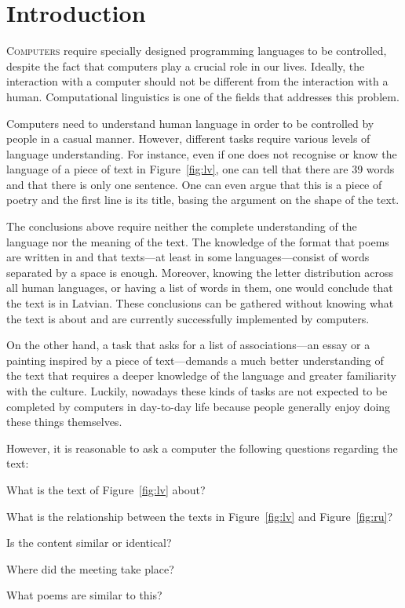 \chapter{Introduction}
\label{ch:introduction}

\lettrine[lines=5,loversize=0.25]{C}{omputers} require specially designed programming languages to be controlled, despite the fact that computers play a crucial role in our lives. Ideally, the interaction with a computer should not be different from the interaction with a human. Computational linguistics is one of the fields that addresses this problem.

Computers need to understand human language in order to be controlled by people in a casual manner. However, different tasks require various levels of language understanding. For instance, even if one does not recognise or know the language of a piece of text in Figure~\ref{fig:lv}, one can tell that there are 39 words and that there is only one sentence. One can even argue that this is a piece of poetry and the first line is its title, basing the argument on the shape of the text.

The conclusions above require neither the complete understanding of the language nor the meaning of the text. The knowledge of the format that poems are written in and that texts---at least in some languages---consist of words separated by a space is enough. Moreover, knowing the letter distribution across all human languages, or having a list of words in them, one would conclude that the text is in Latvian. These conclusions can be gathered without knowing what the text is about and are currently successfully implemented by computers.



On the other hand, a task that asks for a list of associations---an essay or a painting inspired by a piece of text---demands a much better understanding of the text that requires a deeper knowledge of the language and greater familiarity with the culture. Luckily, nowadays these kinds of tasks are not expected to be completed by computers in day-to-day life because people generally enjoy doing these things themselves.

However, it is reasonable to ask a computer the following questions regarding the text:
\begin{inparaenum}[a)]
\item What is the text of Figure~\ref{fig:lv} about?
\item What is the relationship between the texts in Figure~\ref{fig:lv} and
  Figure~\ref{fig:ru}?
\item Is the content similar or identical?
\item Where did the meeting take place?
\item What poems are similar to this?
\end{inparaenum}

